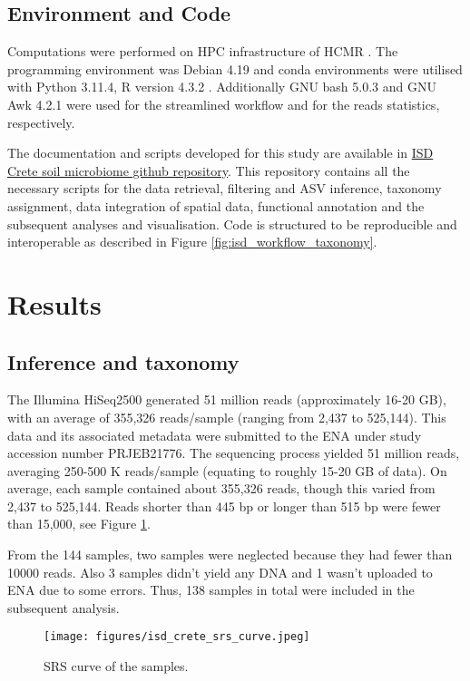 \subsection{Environment and Code}

Computations were performed on HPC infrastructure of HCMR \parencite{zafeiropoulos_0s_2021}.
The programming environment was Debian 4.19 and conda environments were utilised
with Python 3.11.4, R version 4.3.2 \parencite{rcoreteam}.
Additionally GNU bash 5.0.3 and GNU Awk 4.2.1 were used for the streamlined workflow 
and for the reads statistics, respectively.

The documentation and scripts developed for this study are available in
\href{https://github.com/GenomicsStandardsConsortium/ISD}{ISD Crete soil microbiome github repository}.
This repository contains all the necessary scripts for the data retrieval,
filtering and ASV inference, taxonomy assignment, data integration of spatial data, 
functional annotation and the subsequent analyses and visualisation.
Code is structured to be reproducible and interoperable as described in Figure \ref{fig:isd_workflow_taxonomy}.


\section{Results}\label{isd_results}

\subsection{Inference and taxonomy}\label{inference_taxonomy}
The Illumina HiSeq2500 generated 51 million reads (approximately 16-20 GB),
with an average of 355,326 reads/sample (ranging from 2,437 to 525,144).
This data and its associated metadata were submitted to the ENA under study
accession number PRJEB21776. The sequencing process yielded 51 million reads,
averaging 250-500 K reads/sample (equating to roughly 15-20 GB of data).
On average, each sample contained about 355,326 reads, though this varied from
2,437 to 525,144. Reads shorter than 445 bp or longer than 515 bp were fewer than
15,000, see Figure \ref{fig:isd_srs-curve_samples}.

From the 144 samples, two samples were 
neglected because they had fewer than 10000 reads. Also 3 samples didn't yield any DNA and 1 wasn't uploaded to ENA due 
to some errors. Thus, 138 samples in total were included in the subsequent analysis.
   
   \begin{figure}[hbt!]
      \centering
      \texttt{[image: figures/isd\_crete\_srs\_curve.jpeg]}
      \caption[SRS curve]{SRS curve of the samples. }
      \label{fig:isd_srs-curve_samples}
   \end{figure}

